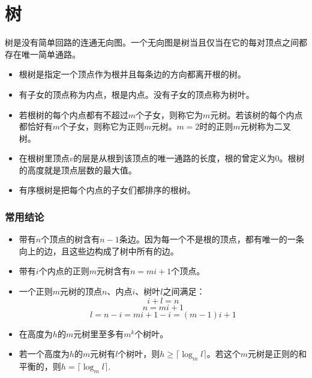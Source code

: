 \section{树}
树是没有简单回路的连通无向图。一个无向图是树当且仅当在它的每对顶点之间都存在唯一简单通路。

\begin{itemize}
    \item 根树是指定一个顶点作为根并且每条边的方向都离开根的树。

    \item 有子女的顶点称为内点，根是内点。没有子女的顶点称为树叶。

    \item 若根树的每个内点都有不超过$m$个子女，则称它为$m$元树。若该树的每个内点都恰好有$m$个子女，则称它为正则$m$元树。$m=2$时的正则$m$元树称为二叉树。

    \item 在根树里顶点$v$的层是从根到该顶点的唯一通路的长度，根的曾定义为0。根树的高度就是顶点层数的最大值。

    \item 有序根树是把每个内点的子女们都排序的根树。
\end{itemize}

\subsubsection*{常用结论}
\begin{itemize}
    \item 带有$n$个顶点的树含有$n-1$条边。因为每一个不是根的顶点，都有唯一的一条向上的边，且这些边构成了树中所有的边。

    \item 带有$i$个内点的正则$m$元树含有$n = mi+1$个顶点。

    \item 一个正则$m$元树的顶点$n$、内点$i$、树叶$l$之间满足：
    \[i + l = n \] \[ n = mi + 1 \] \[ l = n - i = mi + 1 - i = (m-1)i + 1\]

    \item 在高度为$h$的$m$元树里至多有$m^k$个树叶。
    \item 若一个高度为$h$的$m$元树有$l$个树叶，则$h \ge \lceil \log_m l \rceil$。若这个$m$元树是正则的和平衡的，则$h = \lceil \log_m l \rceil$.
\end{itemize}

